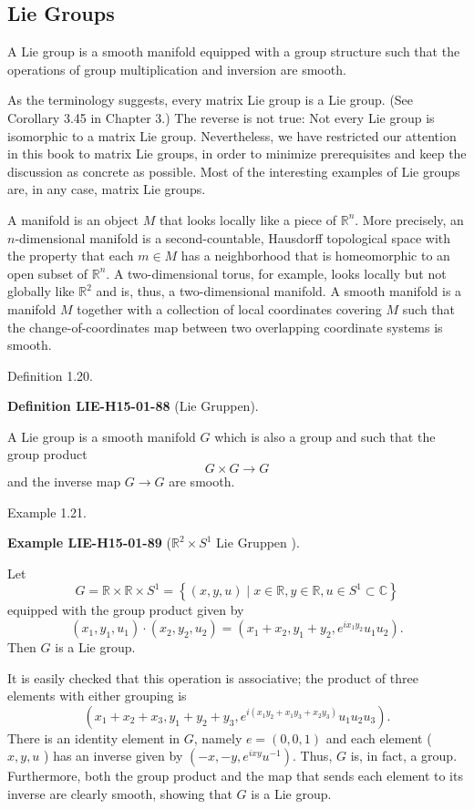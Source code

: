 \documentclass[10pt, letterpaper]{article}
\newcommand{\R}{\mathbb{R}}
\newcommand{\CustomHeading}[3]{%
  \par\medskip\noindent%
  \textbf{#1 #2} \textnormal{(#3)}.\enskip%
}
\newenvironment{DEF}[2]{\begin{unitbox}\CustomHeading{Definition}{#1}{#2}}{\end{unitbox}}
\newenvironment{EXA}[2]{\begin{unitbox}\CustomHeading{Example}{#1}{#2}}{\end{unitbox}}
\begin{document}
\subsection*{Lie Groups}




A Lie group is a smooth manifold equipped with a group structure such that the operations of group multiplication and inversion are smooth.



As the terminology suggests, every matrix Lie group is a Lie group. (See Corollary 3.45 in Chapter 3.) The reverse is not true: Not every Lie group is isomorphic to a matrix Lie group. Nevertheless, we have restricted our attention in this book to matrix Lie groups, in order to minimize prerequisites and keep the discussion as concrete as possible. Most of the interesting examples of Lie groups are, in any case, matrix Lie groups.

A manifold is an object $M$ that looks locally like a piece of $\mathbb{R}^{n}$. More precisely, an $n$-dimensional manifold is a second-countable, Hausdorff topological space with the property that each $m \in M$ has a neighborhood that is homeomorphic to an open subset of $\mathbb{R}^{n}$. A two-dimensional torus, for example, looks locally but not globally like $\mathbb{R}^{2}$ and is, thus, a two-dimensional manifold. A smooth manifold is a manifold $M$ together with a collection of local coordinates covering $M$ such that the change-of-coordinates map between two overlapping coordinate systems is smooth.

Definition 1.20. 


\begin{DEF}{LIE-H15-01-88}{Lie Gruppen}
A Lie group is a smooth manifold $G$ which is also a group and such that the group product
$$
G \times G \rightarrow G
$$
and the inverse map $G \rightarrow G$ are smooth.
\end{DEF}


Example 1.21. 

\begin{EXA}{LIE-H15-01-89}{$\R^2\times S^1$ Lie Gruppen }
Let
$$
G=\mathbb{R} \times \mathbb{R} \times S^{1}=\left\{(x, y, u) \mid x \in \mathbb{R}, y \in \mathbb{R}, u \in S^{1} \subset \mathbb{C}\right\}
$$
equipped with the group product given by
$$
\left(x_{1}, y_{1}, u_{1}\right) \cdot\left(x_{2}, y_{2}, u_{2}\right)=\left(x_{1}+x_{2}, y_{1}+y_{2}, e^{i x_{1} y_{2}} u_{1} u_{2}\right) .
$$
Then $G$ is a Lie group.

It is easily checked that this operation is associative; the product of three elements with either grouping is
$$
\left(x_{1}+x_{2}+x_{3}, y_{1}+y_{2}+y_{3}, e^{i\left(x_{1} y_{2}+x_{1} y_{3}+x_{2} y_{3}\right)} u_{1} u_{2} u_{3}\right) .
$$
There is an identity element in $G$, namely $e=(0,0,1)$ and each element ( $x, y, u$ ) has an inverse given by $\left(-x,-y, e^{i x y} u^{-1}\right)$. Thus, $G$ is, in fact, a group. Furthermore, both the group product and the map that sends each element to its inverse are clearly smooth, showing that $G$ is a Lie group.
\end{EXA}
\end{document}
